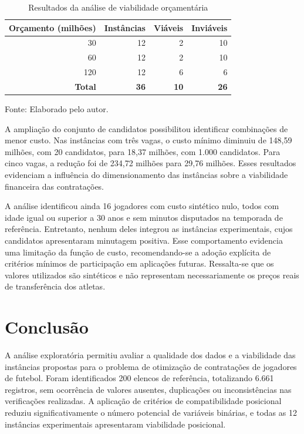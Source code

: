 \documentclass[12pt,a4paper]{article}
\begin{document}
\begin{table}[htbp]
    \centering
    \caption{Resultados da análise de viabilidade orçamentária}
    \label{tab:viabilidade_orcamentaria}
    \begin{tabular}{rrrr}
        \hline
        \textbf{Orçamento (milhões)} & \textbf{Instâncias} & \textbf{Viáveis} & \textbf{Inviáveis} \\
        \hline
        30  & 12 & 2 & 10 \\
        60  & 12 & 2 & 10 \\
        120 & 12 & 6 & 6 \\
        \hline
        \textbf{Total} & \textbf{36} & \textbf{10} & \textbf{26} \\
        \hline
    \end{tabular}
    \par\smallskip
    \footnotesize Fonte: Elaborado pelo autor.
\end{table}

A ampliação do conjunto de candidatos possibilitou identificar combinações de menor custo. Nas instâncias com três vagas, o custo mínimo diminuiu de 148,59 milhões, com 20 candidatos, para 18,37 milhões, com 1.000 candidatos. Para cinco vagas, a redução foi de 234,72 milhões para 29,76 milhões. Esses resultados evidenciam a influência do dimensionamento das instâncias sobre a viabilidade financeira das contratações.

A análise identificou ainda 16 jogadores com custo sintético nulo, todos com idade igual ou superior a 30 anos e sem minutos disputados na temporada de referência. Entretanto, nenhum deles integrou as instâncias experimentais, cujos candidatos apresentaram minutagem positiva. Esse comportamento evidencia uma limitação da função de custo, recomendando-se a adoção explícita de critérios mínimos de participação em aplicações futuras. Ressalta-se que os valores utilizados são sintéticos e não representam necessariamente os preços reais de transferência dos atletas.

\section*{Conclusão}

A análise exploratória permitiu avaliar a qualidade dos dados e a viabilidade das instâncias propostas para o problema de otimização de contratações de jogadores de futebol. Foram identificados 200 elencos de referência, totalizando 6.661 registros, sem ocorrência de valores ausentes, duplicações ou inconsistências nas verificações realizadas. A aplicação de critérios de compatibilidade posicional reduziu significativamente o número potencial de variáveis binárias, e todas as 12 instâncias experimentais apresentaram viabilidade posicional.
\end{document}
